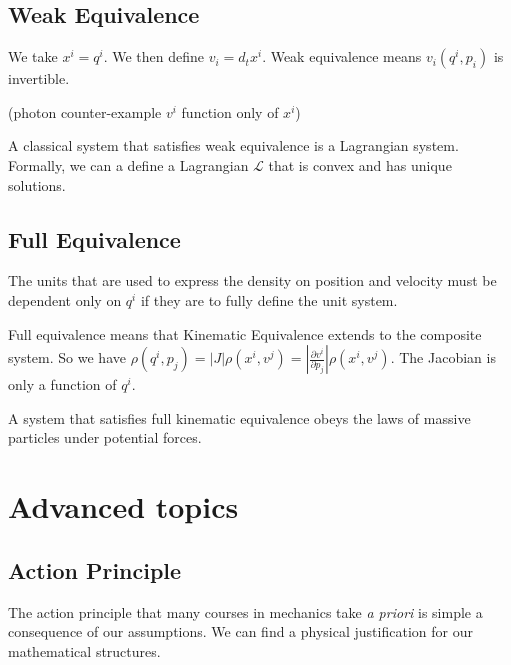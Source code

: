 \documentclass{article}
\begin{document}
\subsection{Weak Equivalence}

\begin{defn}
	We take $x^i = q^i$. We then define $v_i = d_tx^i$. Weak equivalence means $v_i(q^i, p_i)$ is invertible.
\end{defn}

(photon counter-example $v^i$ function only of $x^i$)

\begin{prop}
	A classical system that satisfies weak equivalence is a Lagrangian system. Formally, we can a define a Lagrangian $\mathcal{L}$ that is convex and has unique solutions.
\end{prop}

\subsection{Full Equivalence}

The units that are used to express the density on position and velocity must be dependent only on $q^i$ if they are to fully define the unit system.

\begin{defn}
	Full equivalence means that Kinematic Equivalence extends to the composite system. So we have $\rho(q^i,p_j) = \left|J\right|\rho(x^i,v^j) = \left|\frac{\partial v^i}{\partial p_j}\right|\rho(x^i,v^j)$. The Jacobian is only a function of $q^i$.
\end{defn}

\begin{prop}
	A system that satisfies full kinematic equivalence obeys the laws of massive particles under potential forces.
\end{prop}

\section{Advanced topics}

\subsection{Action Principle}

The action principle that many courses in mechanics take \emph{a priori} is simple a consequence of our assumptions. We can find a physical justification for our mathematical structures.
\end{document}
